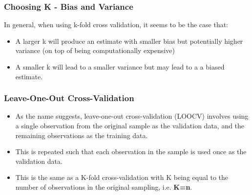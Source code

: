 \documentclass[caret-main.tex]{subfiles}
\begin{document}
\subsubsection{Choosing K - Bias and Variance}
In general, when using k-fold cross validation, it seems to be the case that:
\begin{itemize}
\item A larger k will produce an estimate with smaller bias but potentially higher variance (on top of being computationally expensive)
\item A smaller k will lead to a smaller variance but may lead to a a biased estimate.
\end{itemize}

\subsubsection{Leave-One-Out Cross-Validation}
\begin{itemize}
\item As the name suggests, leave-one-out cross-validation (LOOCV) involves using a single observation from the original sample as the validation data, and the remaining observations as the training data. 
\item This is repeated such that each observation in the sample is used once as the validation data. 
\item This is the same as a K-fold cross-validation with K being equal to the number of observations in the original sampling, i.e. \textbf{K=n}.
\end{itemize}

\newpage
\end{document}
